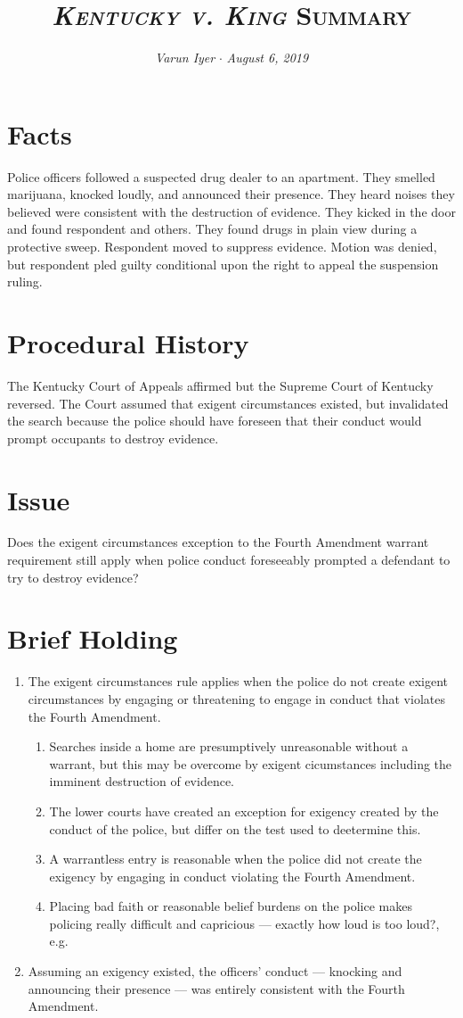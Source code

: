 \documentclass[paper=letter,fontsize=10pt]{article}
\title{\textsc{\textit{Kentucky v. King} Summary}}
\date{}
\author{\textit{Varun Iyer} \hspace{.5em} $\cdot$ \hspace{.5em} \textit{August 6, 2019}}
\begin{document}
\maketitle
\section{Facts}
	Police officers followed a suspected drug dealer to an apartment.
	They smelled marijuana, knocked loudly, and announced their presence.
	They heard noises they believed were consistent with the destruction of evidence.
	They kicked in the door and found respondent and others.
	They found drugs in plain view during a protective sweep.
	Respondent moved to suppress evidence. 
	Motion was denied, but respondent pled guilty conditional upon the right to appeal the suspension ruling.
\section{Procedural History}
	The Kentucky Court of Appeals affirmed but the Supreme Court of Kentucky reversed.
	The Court assumed that exigent circumstances existed, but invalidated the search because the police should have foreseen that their conduct would prompt occupants to destroy evidence.
\section{Issue}
	Does the exigent circumstances exception to the Fourth Amendment
	warrant requirement still apply when police conduct foreseeably prompted
	a defendant to try to destroy evidence?
\section{Brief Holding}
	\begin{enumerate}
		\item The exigent circumstances rule applies when the police do not create exigent circumstances by engaging or threatening to engage in conduct that violates the Fourth Amendment.
		\begin{enumerate}
			\item Searches inside a home are presumptively unreasonable without a warrant, but this may be overcome by exigent cicumstances including the imminent destruction of evidence.
			\item The lower courts have created an exception for exigency created by the conduct of the police, but differ on the test used to deetermine this.
			\item A warrantless entry is reasonable when the police did not create the exigency by engaging in conduct violating the Fourth Amendment.
			\item Placing bad faith or reasonable belief burdens on the police makes policing really difficult and capricious --- exactly how loud is too loud?, e.g.
		\end{enumerate}
		\item Assuming an exigency existed, the officers’ conduct --- knocking and announcing their presence --- was entirely consistent with the Fourth Amendment.
	\end{enumerate}
\end{document}
